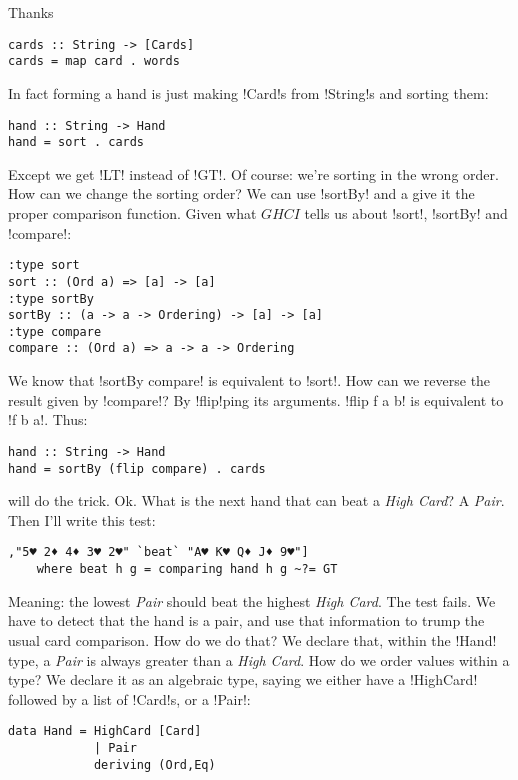 \lhA \error Thanks
\begin{lstlisting}[frame=single]
cards :: String -> [Cards]
cards = map card . words 
\end{lstlisting}
In fact forming a hand is just making \il!Card!s from \il!String!s and sorting them:
\begin{lstlisting}[frame=single]
hand :: String -> Hand
hand = sort . cards
\end{lstlisting}
\failure Except we get \il!LT! instead of \il!GT!.
\lhN Of course: we're sorting in the wrong order. How can we change the sorting order?
\lhA We can use \il!sortBy! and a give it the proper comparison function. 
\lhN Given what $GHCI$ tells us about \il!sort!, \il!sortBy! and \il!compare!:
\begin{small}
\begin{verbatim}
:type sort
sort :: (Ord a) => [a] -> [a]
:type sortBy
sortBy :: (a -> a -> Ordering) -> [a] -> [a]
:type compare
compare :: (Ord a) => a -> a -> Ordering
\end{verbatim}
\end{small}
We know that \il!sortBy compare! is equivalent to \il!sort!. 
How can we reverse the result given by \il!compare!?
\lhA By \il!flip!ping its arguments. \il!flip f a b! is equivalent to \il!f b a!. Thus:
\begin{lstlisting}[frame=single]
hand :: String -> Hand
hand = sortBy (flip compare) . cards
\end{lstlisting}
\success will do the trick.
\lhN Ok. What is the next hand that can beat a \emph{High Card}?
\lhA A \emph{Pair}.
\lhN Then I'll write this test:
\begin{lstlisting}[frame=single]
       ,"5♥ 2♦ 4♦ 3♥ 2♥" `beat` "A♥ K♥ Q♦ J♦ 9♥"]
    where beat h g = comparing hand h g ~?= GT
\end{lstlisting}
Meaning: the lowest \emph{Pair} should beat the highest \emph{High Card}.
\lhA \failure The test fails. We have to detect that the hand is a pair, and use that information to trump the usual card comparison.
\lhN How do we do that?
\lhA \failure We declare that, within the \il!Hand! type, a \emph{Pair} is always greater than a \emph{High Card}. 
\lhN How do we order values within a type?
\lhA \failure We declare it as an algebraic type, saying we either have a \il!HighCard! followed by a list of \il!Card!s, or a \il!Pair!:
\begin{lstlisting}[frame=single]
data Hand = HighCard [Card]
            | Pair
            deriving (Ord,Eq)
\end{lstlisting}
